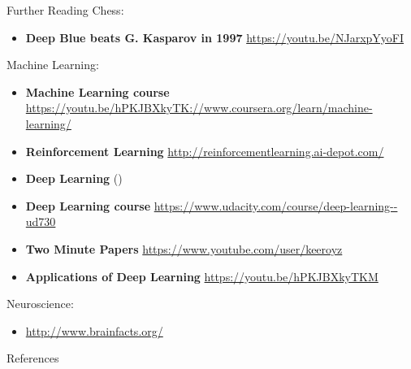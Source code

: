 \documentclass{beamer}
\begin{document}
\begin{frame}[allowframebreaks]{Further Reading}
    Chess:
    \begin{itemize}
      \item \textbf{Deep Blue beats G. Kasparov in 1997} \url{https://youtu.be/NJarxpYyoFI}
    \end{itemize}

    Machine Learning:
    \begin{itemize}
      \item \textbf{Machine Learning course} \url{https://youtu.be/hPKJBXkyTK://www.coursera.org/learn/machine-learning/}
      \item \textbf{Reinforcement Learning} \url{http://reinforcementlearning.ai-depot.com/}
      \item \textbf{Deep Learning} (\cite{Lecun2015deep})
      \item \textbf{Deep Learning course} \url{https://www.udacity.com/course/deep-learning--ud730}
      \item \textbf{Two Minute Papers} \url{https://www.youtube.com/user/keeroyz}
      \item \textbf{Applications of Deep Learning} \url{https://youtu.be/hPKJBXkyTKM}
    \end{itemize}

    Neuroscience:
    \begin{itemize}
      \item \url{http://www.brainfacts.org/}
    \end{itemize}
  \end{frame}

  \begin{frame}[allowframebreaks]{References}
    \tiny
    \printbibliography[heading=none]
  \end{frame}
\end{document}
